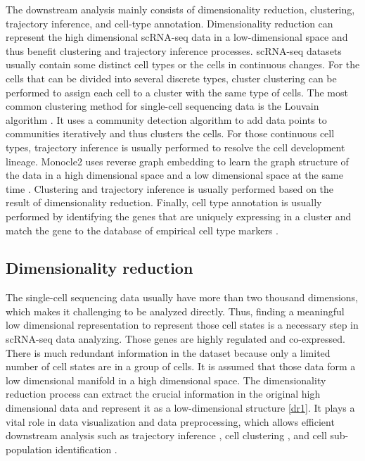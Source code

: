 The downstream analysis mainly consists of dimensionality reduction, clustering, trajectory inference, and cell-type annotation. Dimensionality reduction can represent the high dimensional scRNA-seq data in a low-dimensional space and thus benefit clustering and trajectory inference processes. scRNA-seq datasets usually contain some distinct cell types or the cells in continuous changes. For the cells that can be divided into several discrete types, cluster clustering can be performed to assign each cell to a cluster with the same type of cells. The most common clustering method for single-cell sequencing data is the Louvain algorithm \cite{traag2019louvain}. It uses a community detection algorithm to add data points to communities iteratively and thus clusters the cells. For those continuous cell types, trajectory inference is usually performed to resolve the cell development lineage. Monocle2 uses reverse graph embedding to learn the graph structure of the data in a high dimensional space and a low dimensional space at the same time \cite{qiu2017reversed}. Clustering and trajectory inference is usually performed based on the result of dimensionality reduction. Finally, cell type annotation is usually performed by identifying the genes that are uniquely expressing in a cluster and match the gene to the database of empirical cell type markers \cite{abdelaal2019comparison}. 

\subsection{Dimensionality reduction}

The single-cell sequencing data usually have more than two thousand dimensions, which makes it challenging to be analyzed directly. Thus, finding a meaningful low dimensional representation to represent those cell states is a necessary step in scRNA-seq data analyzing. Those genes are highly regulated and co-expressed. There is much redundant information in the dataset because only a limited number of cell states are in a group of cells. It is assumed that those data form a low dimensional manifold in a high dimensional space. The dimensionality reduction process can extract the crucial information in the original high dimensional data and represent it as a low-dimensional structure \ref{dr1}.  It plays a vital role in data visualization and data preprocessing, which allows efficient downstream analysis such as trajectory inference \cite{Saelens2019}, cell clustering \cite{weber2016comparison}, and cell sub-population identification \cite{Hwang2018}. 

